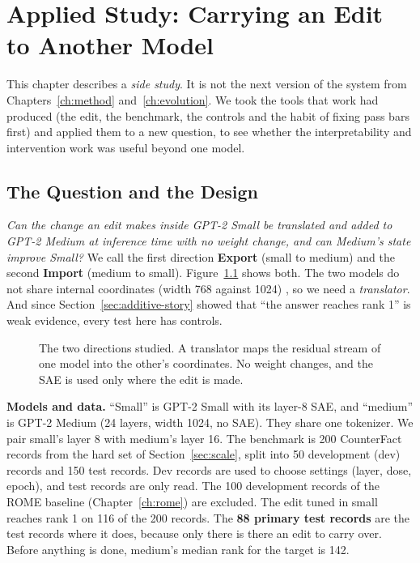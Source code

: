 \chapter{Applied Study: Carrying an Edit to Another Model}\label{ch:transfer}

This chapter describes a \emph{side study}. It is not the next version of the system from Chapters~\ref{ch:method} and~\ref{ch:evolution}. We took the tools that work had produced (the edit, the benchmark, the controls and the habit of fixing pass bars first) and applied them to a new question, to see whether the interpretability and intervention work was useful beyond one model.

\section{The Question and the Design}

\textit{Can the change an edit makes inside GPT-2 Small be translated and added to GPT-2 Medium at inference time with no weight change, and can Medium's state improve Small?} We call the first direction \textbf{Export} (small to medium) and the second \textbf{Import} (medium to small). Figure~\ref{fig:overview} shows both. The two models do not share internal coordinates (width 768 against 1024) \cite{r1}, so we need a \emph{translator}. And since Section~\ref{sec:additive-story} showed that ``the answer reaches rank 1'' is weak evidence, every test here has controls.

\begin{figure}[!htb]
\centering
{}
\caption{The two directions studied. A translator maps the residual stream of one model into the other's coordinates. No weight changes, and the SAE is used only where the edit is made.}\label{fig:overview}
\end{figure}

\textbf{Models and data.} ``Small'' is GPT-2 Small with its layer-8 SAE, and ``medium'' is GPT-2 Medium (24 layers, width 1024, no SAE). They share one tokenizer. We pair small's layer 8 with medium's layer 16. The benchmark is 200 CounterFact records from the hard set of Section~\ref{sec:scale}, split into 50 development (dev) records and 150 test records. Dev records are used to choose settings (layer, dose, epoch), and test records are only read. The 100 development records of the ROME baseline (Chapter~\ref{ch:rome}) are excluded. The edit tuned in small reaches rank 1 on 116 of the 200 records. The \textbf{88 primary test records} are the test records where it does, because only there is there an edit to carry over. Before anything is done, medium's median rank for the target is 142.

